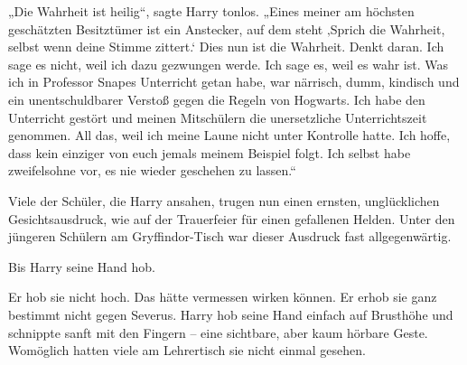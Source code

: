 „Die Wahrheit ist heilig“, sagte Harry tonlos. „Eines meiner am höchsten geschätzten Besitztümer ist ein Anstecker, auf dem steht ‚Sprich die Wahrheit, selbst wenn deine Stimme zittert.‘ Dies nun ist die Wahrheit. Denkt daran. Ich sage es nicht, weil ich dazu gezwungen werde. Ich sage es, weil es wahr ist. Was ich in Professor Snapes Unterricht getan habe, war närrisch, dumm, kindisch und ein unentschuldbarer Verstoß gegen die Regeln von Hogwarts. Ich habe den Unterricht gestört und meinen Mitschülern die unersetzliche Unterrichtszeit genommen. All das, weil ich meine Laune nicht unter Kontrolle hatte. Ich hoffe, dass kein einziger von euch jemals meinem Beispiel folgt. Ich selbst habe zweifelsohne vor, es nie wieder geschehen zu lassen.“ 

Viele der Schüler, die Harry ansahen, trugen nun einen ernsten, unglücklichen Gesichtsausdruck, wie auf der Trauerfeier für einen gefallenen Helden. Unter den jüngeren Schülern am Gryffindor-Tisch war dieser Ausdruck fast allgegenwärtig. 

Bis Harry seine Hand hob. 

Er hob sie nicht hoch. Das hätte vermessen wirken können. Er erhob sie ganz bestimmt nicht gegen Severus. Harry hob seine Hand einfach auf Brusthöhe und schnippte sanft mit den Fingern – eine sichtbare, aber kaum hörbare Geste. Womöglich hatten viele am Lehrertisch sie nicht einmal gesehen. 

